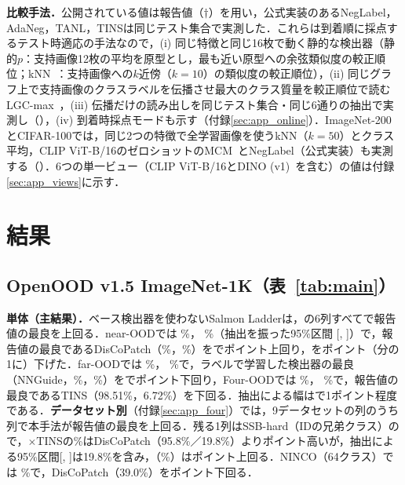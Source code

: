 \textbf{比較手法．}公開されている値は報告値（$\dagger$）を用い，公式実装のあるNegLabel，AdaNeg，TANL，TINSは同じテスト集合で実測した．これらは到着順に採点するテスト時適応の手法なので，(i) 同じ特徴と同じ16枚で動く静的な検出器（静的$p$：支持画像12枚の平均を原型とし，最も近い原型への余弦類似度の較正順位；kNN~\cite{sun2022knn}：支持画像への$k$近傍（$k{=}10$）の類似度の較正順位），(ii) 同じグラフ上で支持画像のクラスラベルを伝播させ最大のクラス質量を較正順位で読むLGC-max~\cite{zhou2004lgc,liu2019tpn}，(iii) 伝播だけの読み出しを同じテスト集合・同じ6通りの抽出で実測し（），(iv) 到着時採点モードも示す（付録\ref{sec:app_online}）．ImageNet-200とCIFAR-100では，同じ2つの特徴で全学習画像を使うkNN（$k{=}50$）とクラス平均，CLIP ViT-B/16のゼロショットのMCM~\cite{ming2022mcm}とNegLabel（公式実装）も実測する（）．6つの単一ビュー（CLIP ViT-B/16とDINO (v1)~\cite{caron2021dino}を含む）の値は付録\ref{sec:app_views}に示す．

\section{結果}
\subsection{OpenOOD v1.5 ImageNet-1K（表~\ref{tab:main}）}
\label{sec:main}
\textbf{単体（主結果）．}ベース検出器を使わないSalmon Ladderは，の6列すべてで報告値の最良を上回る．near-OODでは\AUC{} \NAloneNearAuroc\%，\FPR{} \NAloneNearFpr\%（抽出を振った95\%区間 [\NAloneNearFprLo, \NAloneNearFprHi]）で，報告値の最良であるDisCoPatch（\NBestOtherNearAuroc\%，\NBestOtherNearFpr\%）を\AUC{}で\NAloneGapNearAuroc{}ポイント上回り，\FPR{}を\NAloneGapNearFpr{}ポイント（\NAloneNearFprRatioVsBestOther{}分の1に）下げた．far-OODでは\AUC{} \NAloneFarAuroc\%，\FPR{} \NAloneFarFpr\%で，ラベルで学習した検出器の最良（NNGuide，\NBestOtherFarAuroc\%，\NBestOtherFarFpr\%）を\FPR{}で\NAloneGapFarFpr{}ポイント下回り，Four-OODでは\AUC{} \NAloneFourAuroc\%，\FPR{} \NAloneFourFpr\%で，報告値の最良であるTINS（98.51\%，6.72\%）を下回る．抽出による幅は\FPR{}で1ポイント程度である．\textbf{データセット別}（付録\ref{sec:app_four}）では，9データセットの\NTTwoThreeColsDs{}列のうち\NTTwoThreeWinsDs{}列で本手法が報告値の最良を上回る．残る1列はSSB-hard（IDの兄弟クラス）の\FPR{}で，$\times$TINSの\NSsbHardFpr\%はDisCoPatch（95.8\%／19.8\%）より\NSsbHardVsDiscopatchFprAbs{}ポイント高いが，抽出による95\%区間[\NSsbHardFprLo, \NSsbHardFprHi]は19.8\%を含み，\AUC{}（\NSsbHardAuroc\%）は\NSsbHardVsDiscopatchAuroc{}ポイント上回る．NINCO（64クラス）では\FPR{} \NNincoFpr\%で，DisCoPatch（39.0\%）を\NNincoVsDiscopatchFpr{}ポイント下回る．

